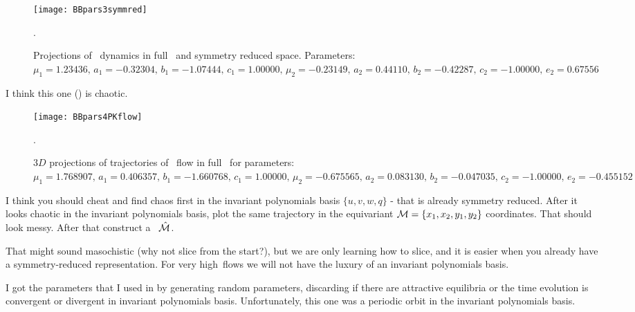\begin{description}
\begin{figure}%
  \begin{center}
  \texttt{[image: BBpars3symmred]}
  \end{center}
  \caption{Projections of \twomode\ dynamics in full \statesp\ and symmetry reduced space. Parameters: $\mu_1 = 1.23436,\,a_1=-0.32304,\,b_1=-1.07444,\,c_1=1.00000,\,\mu_2=-0.23149,\,a_2=0.44110,\,b_2=-0.42287,\,c_2=-1.00000,\,e_2=0.67556$}.
  \label{fig:BBpars3symmred}
\end{figure}

\item[2013-08-08  Burak] I think this one () is chaotic.

\begin{figure}%
  \begin{center}
  \texttt{[image: BBpars4PKflow]}
  \end{center}
  \caption{$3D$ projections of trajectories of \twomode\ flow in full \statesp\ for parameters: $\mu_1 = 1.768907,\,a_1=0.406357,\,b_1=-1.660768,\,c_1=1.00000,\,\mu_2=-0.675565,\,a_2=0.083130,\,b_2=-0.047035,\,c_2=-1.00000,\,e_2=-0.455152$}.
  \label{fig:BBpars4PKflow}
\end{figure}

\item[2013-08-10  Predrag] I think you should cheat and find chaos
    first in the invariant polynomials basis $\{u,v,w,q\}$ -
    that is already symmetry reduced. After it looks chaotic in the
    invariant polynomials basis, plot the same trajectory in the equivariant
 ${\cal M} = \{x_1,x_2,y_1,y_2\}$ coordinates. That should look messy. After
that construct a \slice\ $\hat{\cal M}$.

That might sound masochistic (why not slice from the start?), but we
are only learning how to slice, and it is easier when you already have a
symmetry-reduced representation. For very high\dmn\ flows we will
not have the luxury of an invariant polynomials basis.

\item[2013-08-12  Burak] I got the parameters that I used in  by generating random parameters, discarding if there are attractive equilibria or the time evolution is convergent or divergent in invariant polynomials basis. Unfortunately, this one was a periodic orbit in the invariant polynomials basis.


\end{description}
